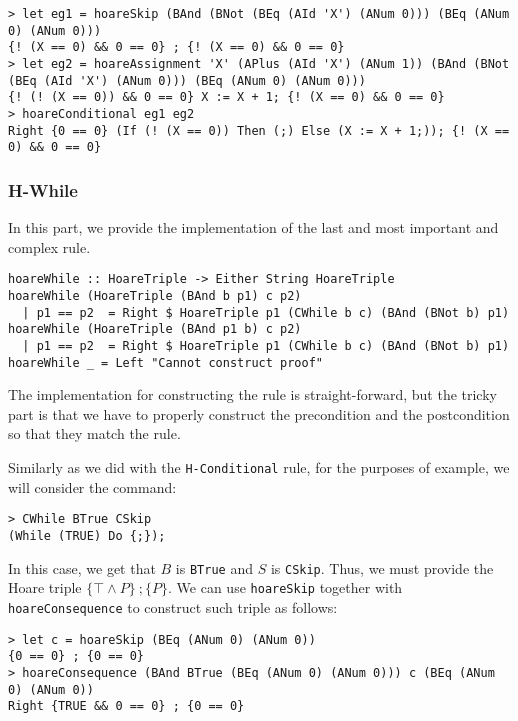 \documentclass{article}
\begin{document}
\begin{lstlisting}
> let eg1 = hoareSkip (BAnd (BNot (BEq (AId 'X') (ANum 0))) (BEq (ANum 0) (ANum 0)))
{! (X == 0) && 0 == 0} ; {! (X == 0) && 0 == 0}
> let eg2 = hoareAssignment 'X' (APlus (AId 'X') (ANum 1)) (BAnd (BNot (BEq (AId 'X') (ANum 0))) (BEq (ANum 0) (ANum 0)))
{! (! (X == 0)) && 0 == 0} X := X + 1; {! (X == 0) && 0 == 0}
> hoareConditional eg1 eg2
Right {0 == 0} (If (! (X == 0)) Then (;) Else (X := X + 1;)); {! (X == 0) && 0 == 0}
\end{lstlisting}

\subsubsection{H-While}

In this part, we provide the implementation of the last and most important and complex rule.

\begin{lstlisting}
hoareWhile :: HoareTriple -> Either String HoareTriple
hoareWhile (HoareTriple (BAnd b p1) c p2)
  | p1 == p2  = Right $ HoareTriple p1 (CWhile b c) (BAnd (BNot b) p1)
hoareWhile (HoareTriple (BAnd p1 b) c p2)
  | p1 == p2  = Right $ HoareTriple p1 (CWhile b c) (BAnd (BNot b) p1)
hoareWhile _ = Left "Cannot construct proof"
\end{lstlisting}

The implementation for constructing the rule is straight-forward, but the tricky part is that we have to properly construct the precondition and the postcondition so that they match the rule.

Similarly as we did with the \texttt{H-Conditional} rule, for the purposes of example, we will consider the command:

\begin{lstlisting}
> CWhile BTrue CSkip
(While (TRUE) Do {;});
\end{lstlisting}

In this case, we get that $B$ is \texttt{BTrue} and $S$ is \texttt{CSkip}. Thus, we must provide the Hoare triple $\{\top \land P \} \ ; \{P\}$. We can use \texttt{hoareSkip} together with \texttt{hoareConsequence} to construct such triple as follows:

\begin{lstlisting}
> let c = hoareSkip (BEq (ANum 0) (ANum 0))
{0 == 0} ; {0 == 0}
> hoareConsequence (BAnd BTrue (BEq (ANum 0) (ANum 0))) c (BEq (ANum 0) (ANum 0))
Right {TRUE && 0 == 0} ; {0 == 0}
\end{lstlisting}
\end{document}
